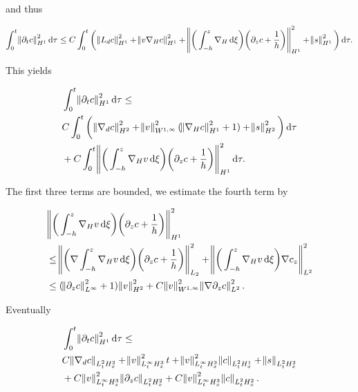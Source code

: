 \documentclass[11pt]{article}
\newcommand*\diff{\mathop{}\!\mathrm{d}}
\begin{document}
and thus

$$\int_0^t \norm{ \partial_t c}_{H^1}^2 \diff \tau \leq C \int_0^t \bigg ( \norm{L_d c}_{H^1}^2 + \norm{v \nabla_H c}_{H^1}^2 + \norm{\bigg ( \int_{-h}^z \nabla_H \diff \xi \bigg ) \bigg ( \partial_z c + \frac{1}{h}\bigg)}_{H^1}^2 + \norm{s}_{H^1}^2 \bigg ) \diff \tau.$$

This yields

\begin{equation}
  \begin{split}
    & \int_0^t \norm{ \partial_t c}_{H^1}^2 \diff \tau \leq \\
    & C \int_0^t \bigg ( \norm{\nabla_d c}_{H^2}^2 + \norm{v}_{W^{1,\infty}}^2 (\norm{\nabla_H c}_{H^1}^2 + 1) + \norm{s}_{H^2}^2 \bigg ) \diff \tau \\
    & + C \int_0^t \norm{\bigg ( \int_{-h}^z \nabla_H v \diff \xi \bigg ) \bigg ( \partial_z c + \frac{1}{h}\bigg)}_{H^1}^2 \diff \tau.
  \end{split}
\end{equation}

The first three terms are bounded, we estimate the fourth term by

\begin{equation}
  \begin{split}
    & \norm{\bigg ( \int_{-h}^z \nabla_H v \diff \xi \bigg ) \bigg ( \partial_z c + \frac{1}{h}\bigg)}_{H^1}^2 \\
    & \leq \norm{\bigg ( \nabla \int_{-h}^z \nabla_H v \diff \xi \bigg ) \bigg ( \partial_z c + \frac{1}{h}\bigg)}_{L_2}^2 + \norm{\bigg ( \int_{-h}^z \nabla_H v \diff \xi \bigg ) \nabla c_z }_{L^2}^2 \\
    & \leq (\norm{\partial_z c}_{L^\infty}^2 +1) \norm{v}_{H^2}^2 + C \norm{v}_{W^{1, \infty}}^2 \norm{\nabla \partial_z c}_{L^2}^2.
  \end{split}
\end{equation}

Eventually

\begin{equation}
  \begin{split}
    & \int_0^t \norm{ \partial_t c}_{H^1}^2 \diff \tau \leq \\
    & C \norm{\nabla_d c}_{L^2_t H^2_x} + \norm{v}_{L^\infty_t H^3_x}^2 t + \norm{v}_{L^\infty_t H^3_x}^2 \norm{c}_{L^2_t H^1_x} + \norm{s}_{L^2_t H^2_x}  \\
    & + C \norm{v}_{L^\infty_t H^3_x}^2 \norm{\partial_z c}_{L^2_t H^2_x}  + C \norm{v}_{L^\infty_t H^3_x}^2 \norm{c}_{L^2_t H^2_x}.
  \end{split}
\end{equation}
\end{document}
